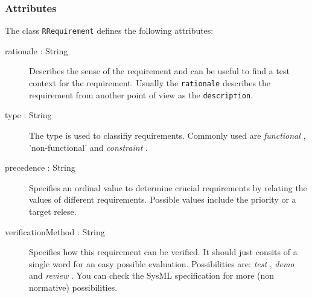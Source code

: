 \subsubsection{Attributes}
The class \verb|RRequirement| defines the following attributes:
\begin{description}
	\item[rationale : String] Describes the sense of the requirement and can be useful to find a test context for the requirement.
Usually the \verb|rationale| describes the requirement from another point of view as the \verb|description|.
	\item[type : String] The type is used to classifiy requirements.
Commonly used are \emph{functional} , 'non-functional' and \emph{constraint} .
	\item[precedence : String] Specifies an ordinal value to determine crucial requirements by relating the values of different requirements.
Possible values include the priority or a target relese.
	\item[verificationMethod : String] Specifies how this requirement can be verified.
It should just consits of a single word for an easy possible evaluation.
Possibilities are: \emph{test} , \emph{demo}  and \emph{review} . You can check the SysML specification for more (non normative) possibilities.
\end{description}

